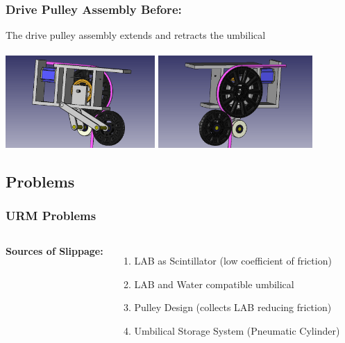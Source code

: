 \documentclass{beamer}
\begin{document}
\begin{frame}
\frametitle{Drive Pulley Assembly Before:}
The drive pulley assembly extends and retracts the umbilical \\~\\
\centering\includegraphics[trim = 20mm 0mm 20mm 0mm, height=3.5cm]{original1}
\centering\includegraphics[trim = 20mm 0mm 20mm 0mm, height=3.5cm]{original2}
\end{frame}

\subsection{Problems}

\begin{frame}
\frametitle{URM Problems}
\begin{columns}[t] %

\textbf{Sources of Slippage:}
\begin{enumerate}
\item LAB as Scintillator (low coefficient of friction)
\item LAB and Water compatible umbilical
\item Pulley Design (collects LAB reducing friction)
\item Umbilical Storage System (Pneumatic Cylinder)
\end{enumerate}



\end{columns}
\end{frame}

\end{document}
